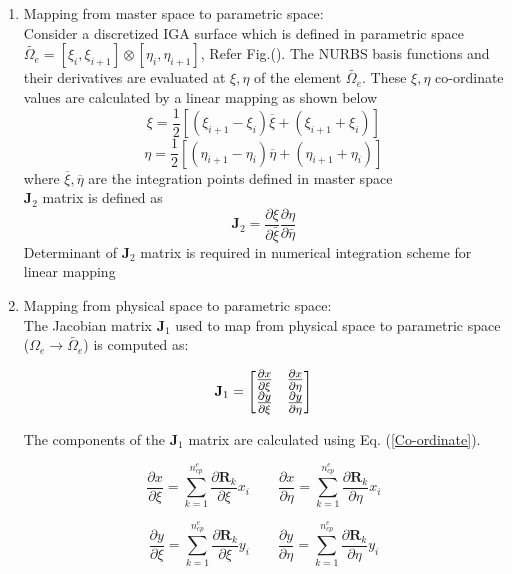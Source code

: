 \documentclass[12pt]{article}
\begin{document}
\begin{enumerate}[leftmargin=*]
	\item Mapping from master space to parametric space: \\
	Consider a discretized IGA surface which is defined in parametric space $\widetilde{\Omega_e}=[\xi_i,\xi_{i+1}]\otimes[\eta_i,\eta_{i+1}]$, Refer Fig.(). The NURBS basis functions and their derivatives are evaluated at $\xi,\eta$ of the element $\widetilde{\Omega_e}$. These $\xi,\eta$ co-ordinate values are calculated by a linear mapping as shown below
	\begin{equation}
	\xi=\frac{1}{2}[(\xi_{i+1}-\xi_{i})\overline{\xi}+(\xi_{i+1}+\xi_{i})]
	\end{equation} 
	\begin{equation}
	\eta=\frac{1}{2}[(\eta_{i+1}-\eta_{i})\overline{\eta}+(\eta_{i+1}+\eta_{i})]
	\end{equation}
	where $\overline{\xi},\overline{\eta}$ are the integration points defined in master space \\
	$\textbf{J}_2$ matrix is defined as 
	\begin{equation}
	\textbf{J}_2 = \frac{\partial\xi}{\partial \bar{\xi}} \frac{\partial\eta}{\partial \bar{\eta}}
	\end{equation} 
	Determinant of $\textbf{J}_2$ matrix is required in numerical integration scheme for linear mapping 
	
	
	\item Mapping from physical space to parametric space: \\
	The Jacobian matrix $\textbf{J}_1$ used to map from physical space to parametric space ($\Omega_e \rightarrow \widetilde{\Omega_e}$) is computed as:
	
	\begin{equation} \label{J1Matrix1}
	\textbf{J}_1 =
	\large
	\begin{bmatrix}
	\frac{\partial x}{\partial \xi} &\frac{\partial x}{\partial \eta} \\
	\frac{\partial y}{\partial \xi} &\frac{\partial y}{\partial \eta} \\
	\end{bmatrix} 
	\end{equation}
	
	The components of the $\textbf{J}_1$ matrix are calculated using Eq. (\ref{Co-ordinate}).
	
	\begin{equation}
	\frac{\partial x}{\partial \xi} = \sum_{k=1}^{n_{cp}^e} \frac{\partial \textbf{R}_k}{\partial \xi} x_i
	\qquad
	\frac{\partial x}{\partial \eta} = \sum_{k=1}^{n_{cp}^e} \frac{\partial \textbf{R}_k}{\partial \eta} x_i
	\end{equation} 
	
	\begin{equation}
	\frac{\partial y}{\partial \xi} = \sum_{k=1}^{n_{cp}^e} \frac{\partial \textbf{R}_k}{\partial \xi} y_i
	\qquad
	\frac{\partial y}{\partial \eta} = \sum_{k=1}^{n_{cp}^e} \frac{\partial \textbf{R}_k}{\partial \eta} y_i
	\end{equation}
	
\end{enumerate}
\end{document}
